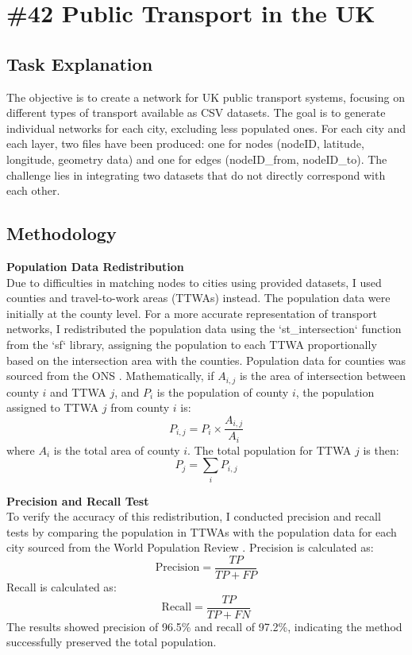 \chapter{\#42 Public Transport in the UK}

\section{Task Explanation}
The objective is to create a network for UK public transport systems, focusing on different types of transport available as CSV datasets. The goal is to generate individual networks for each city, excluding less populated ones. For each city and each layer, two files have been produced: one for nodes (nodeID, latitude, longitude, geometry data) and one for edges (nodeID\_from, nodeID\_to). The challenge lies in integrating two datasets that do not directly correspond with each other.

\section{Methodology}
\textbf{Population Data Redistribution} \\
Due to difficulties in matching nodes to cities using provided datasets, I used counties and travel-to-work areas (TTWAs) instead. The population data were initially at the county level. For a more accurate representation of transport networks, I redistributed the population data using the `st\_intersection` function from the `sf` library, assigning the population to each TTWA proportionally based on the intersection area with the counties. Population data for counties was sourced from the ONS \cite{county_population_data}.
Mathematically, if $A_{i,j}$ is the area of intersection between county $i$ and TTWA $j$, and $P_i$ is the population of county $i$, the population assigned to TTWA $j$ from county $i$ is:
\begin{equation}
 P_{i,j} = P_i \times \frac{A_{i,j}}{A_i}
\end{equation}
where $A_i$ is the total area of county $i$. The total population for TTWA $j$ is then:
\begin{equation}
 P_j = \sum_i P_{i,j}
\end{equation}

\noindent \textbf{Precision and Recall Test} \\
To verify the accuracy of this redistribution, I conducted precision and recall tests by comparing the population in TTWAs with the population data for each city sourced from the World Population Review \cite{city_population_data}. Precision is calculated as:
\begin{equation}
\text{Precision} = \frac{TP}{TP + FP}
\end{equation}
Recall is calculated as:
\begin{equation}
\text{Recall} = \frac{TP}{TP + FN}
\end{equation}
The results showed precision of 96.5\% and recall of 97.2\%, indicating the method successfully preserved the total population.

